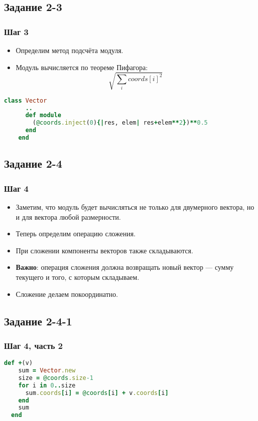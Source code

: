 \documentclass[compress,red]{beamer}
\begin{document}
\subsection{Задание 2-3}
\begin{frame}[fragile]
  \frametitle{Шаг 3}
  \begin{itemize}
    \item Определим метод подсчёта модуля.
    \item Модуль вычисляется по теореме Пифагора:
    $$
      \sqrt{\sum_i coords[i]^2}
    $$
  \end{itemize}
  \scriptsize{
  \begin{lstlisting}[language=ruby,basicstyle=\footnotesize,label=ruby13,caption=Вычисление модуля]
    class Vector
      ..
      def module
        (@coords.inject(0){|res, elem| res+elem**2})**0.5
      end
    end
  \end{lstlisting}
  }
\end{frame}

\subsection{Задание 2-4}
\begin{frame}[fragile]
  \frametitle{Шаг 4}
  \begin{itemize}
    \item Заметим, что модуль будет вычисляться не только для двумерного вектора, но и для вектора любой размерности.
    \item Теперь определим операцию сложения.
    \item При сложении компоненты векторов также складываются.
    \item \textbf{Важно}: операция сложения должна возвращать новый вектор --- сумму текущего и того, с которым складываем.
    \item Сложение делаем покоординатно.
  \end{itemize}
\end{frame}

\subsection{Задание 2-4-1}
\begin{frame}[fragile]
  \frametitle{Шаг 4, часть 2}
  \scriptsize{
  \begin{lstlisting}[language=ruby,basicstyle=\footnotesize,label=ruby14,caption=Сложение]
  def +(v)
    sum = Vector.new
    size = @coords.size-1
    for i in 0..size
      sum.coords[i] = @coords[i] + v.coords[i]
    end
    sum
  end
  \end{lstlisting}
  }
\end{frame}
\end{document}
